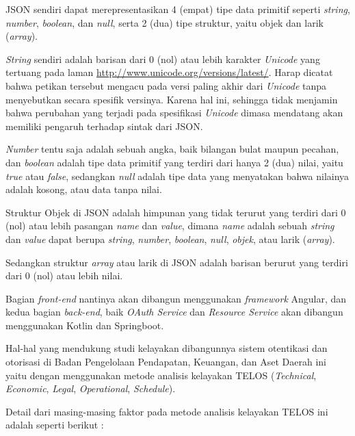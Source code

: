 \documentclass[pdftex,12pt, oneside]{article}
\begin{document}
JSON sendiri dapat merepresentasikan 4 (empat) tipe data primitif seperti \textit{string}, \textit{number}, \textit{boolean}, dan \textit{null}, serta 2 (dua) tipe struktur, yaitu objek dan larik (\textit{array}).

\textit{String} sendiri adalah barisan dari 0 (nol) atau lebih karakter \textit{Unicode} yang tertuang pada laman \href{http://www.unicode.org/versions/latest/}{http://www.unicode.org/versions/latest/}. Harap dicatat bahwa petikan tersebut mengacu pada versi paling akhir dari \textit{Unicode} tanpa menyebutkan secara spesifik versinya. Karena hal ini, sehingga tidak menjamin bahwa perubahan yang terjadi pada spesifikasi \textit{Unicode} dimasa mendatang akan memiliki pengaruh terhadap sintak dari JSON.

\textit{Number} tentu saja adalah sebuah angka, baik bilangan bulat maupun pecahan, dan \textit{boolean} adalah tipe data primitif yang terdiri dari hanya 2 (dua) nilai, yaitu \textit{true} atau \textit{false}, sedangkan \textit{null} adalah tipe data yang menyatakan bahwa nilainya adalah kosong, atau data tanpa nilai.

Struktur Objek di JSON adalah himpunan yang tidak terurut yang terdiri dari 0 (nol) atau lebih pasangan \textit{name} dan \textit{value}, dimana \textit{name} adalah sebuah \textit{string} dan \textit{value} dapat berupa \textit{string}, \textit{number}, \textit{boolean}, \textit{null}, \textit{objek}, atau larik (\textit{array}).

Sedangkan struktur \textit{array} atau larik di JSON adalah barisan berurut yang terdiri dari 0 (nol) atau lebih nilai.

Bagian \textit{front-end} nantinya akan dibangun menggunakan \textit{framework} Angular, dan kedua bagian \textit{back-end}, baik \textit{OAuth Service} dan \textit{Resource Service} akan dibangun menggunakan Kotlin dan Springboot.

Hal-hal yang mendukung studi kelayakan dibangunnya sistem otentikasi dan otorisasi di Badan Pengelolaan Pendapatan, Keuangan, dan Aset Daerah ini yaitu dengan menggunakan metode analisis kelayakan TELOS (\textit{Technical}, \textit{Economic}, \textit{Legal}, \textit{Operational}, \textit{Schedule}).

Detail dari masing-masing faktor pada metode analisis kelayakan TELOS ini adalah seperti berikut :
\end{document}
